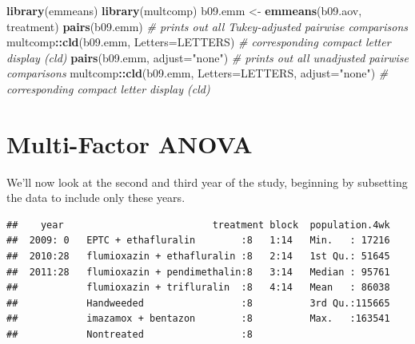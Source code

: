 \documentclass[letterpaper,]{book}
\newenvironment{Shaded}{\begin{snugshade}}{\end{snugshade}}
\newcommand{\CommentTok}[1]{\textcolor[rgb]{0.56,0.35,0.01}{\textit{#1}}}
\newcommand{\DataTypeTok}[1]{\textcolor[rgb]{0.13,0.29,0.53}{#1}}
\newcommand{\DecValTok}[1]{\textcolor[rgb]{0.00,0.00,0.81}{#1}}
\newcommand{\KeywordTok}[1]{\textcolor[rgb]{0.13,0.29,0.53}{\textbf{#1}}}
\newcommand{\NormalTok}[1]{#1}
\newcommand{\OperatorTok}[1]{\textcolor[rgb]{0.81,0.36,0.00}{\textbf{#1}}}
\newcommand{\StringTok}[1]{\textcolor[rgb]{0.31,0.60,0.02}{#1}}
\begin{document}
\begin{Shaded}
\begin{Highlighting}[]
\KeywordTok{library}\NormalTok{(emmeans)}
\KeywordTok{library}\NormalTok{(multcomp)}
\NormalTok{b09.emm <-}\StringTok{ }\KeywordTok{emmeans}\NormalTok{(b09.aov, }\OperatorTok{~}\StringTok{ }\NormalTok{treatment)}
\KeywordTok{pairs}\NormalTok{(b09.emm) }\CommentTok{# prints out all Tukey-adjusted pairwise comparisons}
\NormalTok{multcomp}\OperatorTok{::}\KeywordTok{cld}\NormalTok{(b09.emm, }\DataTypeTok{Letters=}\NormalTok{LETTERS) }\CommentTok{# corresponding compact letter display (cld)}
\KeywordTok{pairs}\NormalTok{(b09.emm, }\DataTypeTok{adjust=}\StringTok{"none"}\NormalTok{) }\CommentTok{# prints out all unadjusted pairwise comparisons}
\NormalTok{multcomp}\OperatorTok{::}\KeywordTok{cld}\NormalTok{(b09.emm, }\DataTypeTok{Letters=}\NormalTok{LETTERS, }\DataTypeTok{adjust=}\StringTok{"none"}\NormalTok{) }\CommentTok{# corresponding compact letter display (cld)}
\end{Highlighting}
\end{Shaded}

\hypertarget{multi-factor-anova}{%
\section{Multi-Factor ANOVA}\label{multi-factor-anova}}

We'll now look at the second and third year of the study, beginning by subsetting the data to include only these years.

\begin{Shaded}
\end{Shaded}

\begin{verbatim}
##    year                          treatment block  population.4wk  
##  2009: 0   EPTC + ethafluralin        :8   1:14   Min.   : 17216  
##  2010:28   flumioxazin + ethafluralin :8   2:14   1st Qu.: 51645  
##  2011:28   flumioxazin + pendimethalin:8   3:14   Median : 95761  
##            flumioxazin + trifluralin  :8   4:14   Mean   : 86038  
##            Handweeded                 :8          3rd Qu.:115665  
##            imazamox + bentazon        :8          Max.   :163541  
##            Nontreated                 :8
\end{verbatim}
\end{document}
